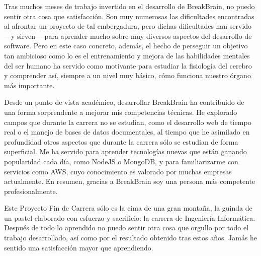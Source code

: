 Tras muchos meses de trabajo invertido en el desarrollo de BreakBrain, no puedo sentir otra cosa que satisfacción. Son muy numerosas las dificultades encontradas al afrontar un proyecto de tal embergadura, pero dichas dificultades han servido ---y sirven--- para aprender mucho sobre muy diversos aspectos del desarrollo de software. Pero en este caso concreto, además, el hecho de perseguir un objetivo tan ambicioso como lo es el entrenamiento y mejora de las habilidades mentales del ser humano ha servido como motivante para estudiar la fisiología del cerebro y comprender así, siempre a un nivel muy básico, cómo funciona nuestro órgano más importante.

Desde un punto de vista académico, desarrollar BreakBrain ha contribuido de una forma sorprendente a mejorar mis competencias técnicas. He explorado campos que durante la carrera no se estudian, como el desarrollo web de tiempo real o el manejo de bases de datos documentales, al tiempo que he asimilado en profundidad otros aspectos que durante la carrera sólo se estudian de forma superficial. Me ha servido para aprender tecnologías nuevas que están ganando popularidad cada día, como NodeJS o MongoDB, y para familiarizarme con servicios como \acf{AWS}, cuyo conocimiento es valorado por muchas empresas actualmente. En resumen, gracias a BreakBrain soy una persona más competente profesionalmente.

Este Proyecto Fin de Carrera sólo es la cima de una gran montaña, la guinda de un pastel elaborado con esfuerzo y sacrificio: la carrera de Ingeniería Informática. Después de todo lo aprendido no puedo sentir otra cosa que orgullo por todo el trabajo desarrollado, así como por el resultado obtenido tras estos años. Jamás he sentido una satisfacción mayor que aprendiendo.



